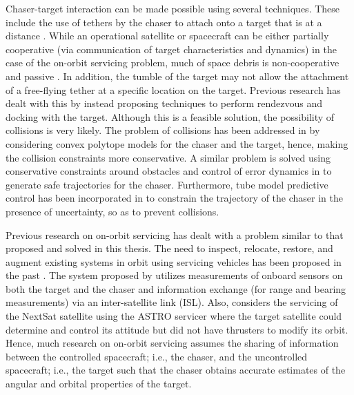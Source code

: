 Chaser-target interaction can be made possible using several techniques.
These include the use of tethers by the chaser to attach onto a target that is at a distance \cite{zhang2019trajectory,olivieri2020test,liu2021trajectory}.
While an operational satellite or spacecraft can be either partially cooperative (via communication of target characteristics and dynamics) in the case of the on-orbit servicing problem, much of space debris is non-cooperative and passive \cite{albee2021robust}.
In addition, the tumble of the target may not allow the attachment of a free-flying tether at a specific location on the target.
Previous research \cite{park2017nonlinear} has dealt with this by instead proposing techniques to perform rendezvous and docking with the target.
Although this is a feasible solution, the possibility of collisions is very likely.
The problem of collisions has been addressed in \cite{stoneman2016nonlinear} by considering convex polytope models for the chaser and the target, hence, making the collision constraints more conservative.
A similar problem is solved using conservative constraints around obstacles and control of error dynamics in \cite{ali2019safe} to generate safe trajectories for the chaser.
Furthermore, tube model predictive control has been incorporated in \cite{specht2023autonomous} to constrain the trajectory of the chaser in the presence of uncertainty, so as to prevent collisions.

Previous research on on-orbit servicing has dealt with a problem similar to that proposed and solved in this thesis.
The need to inspect, relocate, restore, and augment existing systems in orbit using servicing vehicles has been proposed in the past \cite{long2007orbit}.
The system proposed by \cite{battistini2022iterative} utilizes measurements of onboard sensors on both the target and the chaser and information exchange (for range and bearing measurements) via an inter-satellite link (ISL).
Also, \cite{ogilvie2008autonomous} considers the servicing of the NextSat satellite using the ASTRO servicer where the target satellite could determine and control its attitude but did not have thrusters to modify its orbit.
Hence, much research on on-orbit servicing assumes the sharing of information between the controlled spacecraft; i.e., the chaser, and the uncontrolled spacecraft; i.e., the target such that the chaser obtains accurate estimates of the angular and orbital properties of the target.

